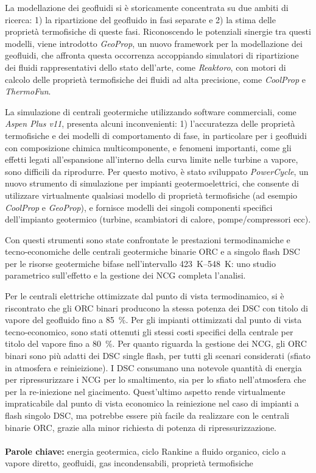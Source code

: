 La modellazione dei geofluidi si è storicamente concentrata su due ambiti di ricerca: 1) la ripartizione del geofluido in fasi separate e 2) la stima delle proprietà termofisiche di queste fasi. Riconoscendo le potenziali sinergie tra questi modelli, viene introdotto \emph{GeoProp}, un nuovo framework per la modellazione dei geofluidi, che affronta questa occorrenza accoppiando simulatori di ripartizione dei fluidi rappresentativi dello stato dell’arte, come \emph{Reaktoro}, con motori di calcolo delle proprietà termofisiche dei fluidi ad alta precisione, come \emph{CoolProp} e \emph{ThermoFun}.

La simulazione di centrali geotermiche utilizzando software commerciali, come \emph{Aspen Plus v11}, presenta alcuni inconvenienti: 1) l’accuratezza delle proprietà termofisiche e dei modelli di comportamento di fase, in particolare per i geofluidi con composizione chimica multicomponente, e fenomeni importanti, come gli effetti legati all’espansione all’interno della curva limite nelle turbine a vapore, sono difficili da riprodurre. Per questo motivo, è stato sviluppato \emph{PowerCycle}, un nuovo strumento di simulazione per impianti geotermoelettrici, che consente di utilizzare virtualmente qualsiasi modello di proprietà termofisiche (ad esempio \emph{CoolProp} e \emph{GeoProp}), e fornisce modelli dei singoli componenti specifici dell’impianto geotermico (turbine, scambiatori di calore, pompe/compressori ecc).

Con questi strumenti sono state confrontate le prestazioni termodinamiche e tecno-economiche delle centrali geotermiche binarie \ac{ORC} e a singolo flash \ac{DSC} per le risorse geotermiche bifase nell’intervallo \qtyrange{423}{548}{\K}: uno studio parametrico sull’effetto e la gestione dei \ac{NCG} completa l’analisi.

Per le centrali elettriche ottimizzate dal punto di vista termodinamico, si è riscontrato che gli \ac{ORC} binari producono la stessa potenza dei \ac{DSC} con titolo di vapore del geofluido fino a \qty{85}{\percent}. Per gli impianti ottimizzati dal punto di vista tecno-economico, sono stati ottenuti gli stessi costi specifici della centrale per titolo del vapore fino a \qty{80}{\percent}. Per quanto riguarda la gestione dei \ac{NCG}, gli \ac{ORC} binari sono più adatti dei \ac{DSC} single flash, per tutti gli scenari considerati (sfiato in atmosfera e reinieizione). I \ac{DSC} consumano una notevole quantità di energia per ripressurizzare i \ac{NCG} per lo smaltimento, sia per lo sfiato nell’atmosfera che per la re-iniezione nel giacimento. Quest’ultimo aspetto rende virtualmente impraticabile dal punto di vista economico la reiniezione nel caso di impianti a flash singolo \ac{DSC}, ma potrebbe essere più facile da realizzare con le centrali binarie \ac{ORC}, grazie alla minor richiesta di potenza di ripressurizzazione.
\\
\\
\textbf{Parole chiave:} energia geotermica, ciclo Rankine a fluido organico, ciclo a vapore diretto,
geofluidi, gas incondensabili, proprietà termofisiche
